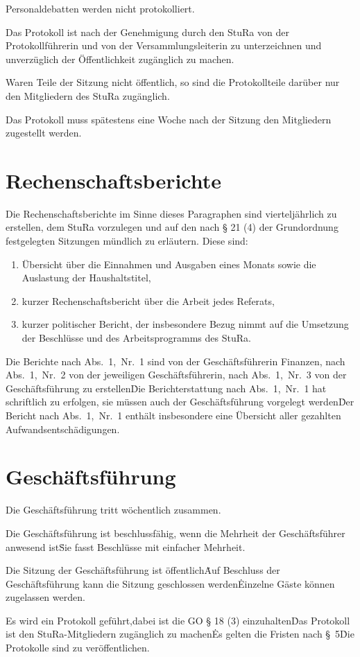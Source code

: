 \begin{multicols}{2}
\Abs \Satz Personaldebatten werden nicht protokolliert.

\Abs \Satz Das Protokoll ist nach der Genehmigung durch den StuRa von der Protokollführerin und von der Versammlungsleiterin zu unterzeichnen und unverzüglich der Öffentlichkeit zugänglich zu machen.

\Abs \Satz Waren Teile der Sitzung nicht öffentlich, so sind die Protokollteile darüber nur den Mitgliedern des StuRa zugänglich.

\Abs \Satz Das Protokoll muss spätestens eine Woche nach der Sitzung den Mitgliedern zugestellt werden.



\section{Rechenschaftsberichte}

\Abs \Satz Die Rechenschaftsberichte im Sinne dieses Paragraphen sind vierteljährlich zu erstellen, dem StuRa vorzulegen und auf den nach § 21 (4) der Grundordnung festgelegten Sitzungen mündlich zu erläutern. Diese sind:
\begin{enumerate}
\item Übersicht über die Einnahmen und Ausgaben eines Monats sowie die Auslastung der Haushaltstitel,
\item kurzer Rechenschaftsbericht über die Arbeit jedes Referats,
\item kurzer politischer Bericht, der insbesondere Bezug nimmt auf die Umsetzung der Beschlüsse und des Arbeitsprogramms des StuRa.
\end{enumerate}

\Abs \Satz Die Berichte nach Abs.~1,~Nr.~1 sind von der Geschäftsführerin Finanzen, nach Abs.~1,~Nr.~2 von der jeweiligen Geschäftsführerin, nach Abs.~1,~Nr.~3 von der Geschäftsführung zu erstellen\. Die Berichterstattung nach Abs.~1,~Nr.~1 hat schriftlich zu erfolgen, sie müssen auch der Geschäftsführung vorgelegt werden\. Der Bericht nach Abs.~1,~Nr.~1 enthält insbesondere eine Übersicht aller gezahlten Aufwandsentschädigungen.



\section{Geschäftsführung}

\Abs \Satz Die Geschäftsführung tritt wöchentlich zusammen.

\Abs \Satz Die Geschäftsführung ist beschlussfähig, wenn die Mehrheit der Geschäftsführer anwesend ist\. Sie fasst Beschlüsse mit einfacher Mehrheit.

\Abs \Satz Die Sitzung der Geschäftsführung ist öffentlich\. Auf Beschluss der Geschäftsführung kann die Sitzung geschlossen werden\. Einzelne Gäste können zugelassen werden.

\Abs \Satz Es wird ein Protokoll geführt,dabei ist die GO § 18 (3) einzuhalten\.  Das Protokoll ist den StuRa-Mitgliedern zugänglich zu machen\. Es gelten die Fristen nach §~5\. Die Protokolle sind zu veröffentlichen.

\end{multicols}

